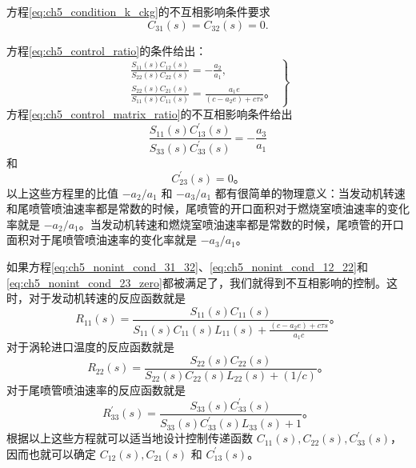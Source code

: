 方程\eqref{eq:ch5_condition_k_ckg}的不互相影响条件要求
\begin{equation}\label{eq:ch5_nonint_cond_31_32}
C_{31}(s) = C_{32}(s) = 0.
\end{equation}

方程\eqref{eq:ch5_control_ratio}的条件给出：
\begin{equation}\label{eq:ch5_nonint_cond_12_22}
\left.
\begin{array}{l}
\frac{S_{11}(s)C_{12}(s)}{S_{22}(s)C_{22}(s)} = -\frac{a_2}{a_1},\\
\frac{S_{22}(s)C_{21}(s)}{S_{11}(s)C_{11}(s)} = \frac{a_1 e}{(c - a_2 e) + c \tau s}。
\end{array}
\right\}
\end{equation}
方程\eqref{eq:ch5_control_matrix_ratio}的不互相影响条件给出
\begin{equation*}
\frac{S_{11}(s)C_{13}^{\prime}(s)}{S_{33}(s)C_{33}^{\prime}(s)} = -\frac{a_3}{a_1}
\end{equation*}
和
\begin{equation}\label{eq:ch5_nonint_cond_23_zero}
C_{23}^{\prime}(s) = 0。
\end{equation}
以上这些方程里的比值 $-a_2 / a_1$ 和 $-a_3 / a_1$ 都有很简单的物理意义：当发动机转速和尾喷管喷油速率都是常数的时候，尾喷管的开口面积对于燃烧室喷油速率的变化率就是 $-a_2 / a_1$。当发动机转速和燃烧室喷油速率都是常数的时候，尾喷管的开口面积对于尾喷管喷油速率的变化率就是 $-a_3 / a_1$。

如果方程\eqref{eq:ch5_nonint_cond_31_32}、\eqref{eq:ch5_nonint_cond_12_22}和\eqref{eq:ch5_nonint_cond_23_zero}都被满足了，我们就得到不互相影响的控制。这时，对于发动机转速的反应函数就是
\begin{equation}\label{eq:ch5_response_R11_jet}
R_{11}(s) = \frac{S_{11}(s)C_{11}(s)}{S_{11}(s)C_{11}(s)L_{11}(s) + \frac{(c - a_2 e) + c \tau s}{a_1 c}}。
\end{equation}
对于涡轮进口温度的反应函数就是
\begin{equation}\label{eq:ch5_response_R22_jet}
R_{22}(s) = \frac{S_{22}(s)C_{22}(s)}{S_{22}(s)C_{22}(s)L_{22}(s) + (1/c)}。
\end{equation}
对于尾喷管喷油速率的反应函数就是
\begin{equation}\label{eq:ch5_response_R33_jet}
R_{33}^{\prime}(s) = \frac{S_{33}(s)C_{33}^{\prime}(s)}{S_{33}(s)C_{33}^{\prime}(s)L_{33}(s) + 1}。
\end{equation}
根据以上这些方程就可以适当地设计控制传递函数 $C_{11}(s), C_{22}(s), C_{33}^{\prime}(s)$，因而也就可以确定 $C_{12}(s), C_{21}(s)$ 和 $C_{13}^{\prime}(s)$。